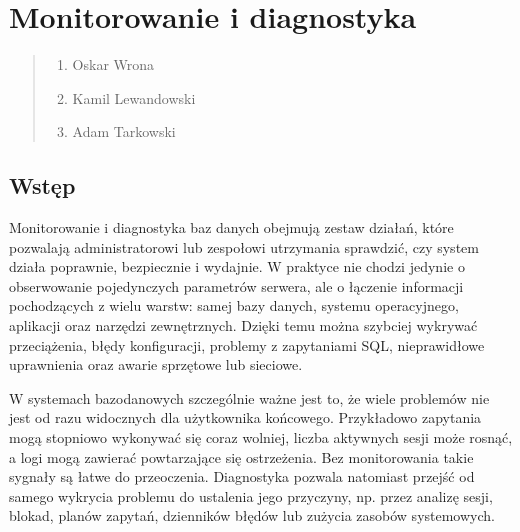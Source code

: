 \documentclass[letterpaper,10pt,polish]{sphinxmanual}
\begin{document}
\section{Monitorowanie i diagnostyka}
\label{\detokenize{rozdzia_u0142_2/rozdzia_u0142_24/index:monitorowanie-i-diagnostyka}}\label{\detokenize{rozdzia_u0142_2/rozdzia_u0142_24/index::doc}}\begin{quote}\begin{description}
\begin{enumerate}
%
\item {} 
\sphinxAtStartPar
Oskar Wrona

\item {} 
\sphinxAtStartPar
Kamil Lewandowski

\item {} 
\sphinxAtStartPar
Adam Tarkowski

\end{enumerate}

\end{description}\end{quote}


\subsection{Wstęp}
\label{\detokenize{rozdzia_u0142_2/rozdzia_u0142_24/index:wstep}}
\sphinxAtStartPar
Monitorowanie i diagnostyka baz danych obejmują zestaw działań, które pozwalają administratorowi lub zespołowi utrzymania sprawdzić, czy system działa poprawnie, bezpiecznie i wydajnie. W praktyce nie chodzi jedynie o obserwowanie pojedynczych parametrów serwera, ale o łączenie informacji pochodzących z wielu warstw: samej bazy danych, systemu operacyjnego, aplikacji oraz narzędzi zewnętrznych. Dzięki temu można szybciej wykrywać przeciążenia, błędy konfiguracji, problemy z zapytaniami SQL, nieprawidłowe uprawnienia oraz awarie sprzętowe lub sieciowe.

\sphinxAtStartPar
W systemach bazodanowych szczególnie ważne jest to, że wiele problemów nie jest od razu widocznych dla użytkownika końcowego. Przykładowo zapytania mogą stopniowo wykonywać się coraz wolniej, liczba aktywnych sesji może rosnąć, a logi mogą zawierać powtarzające się ostrzeżenia. Bez monitorowania takie sygnały są łatwe do przeoczenia. Diagnostyka pozwala natomiast przejść od samego wykrycia problemu do ustalenia jego przyczyny, np. przez analizę sesji, blokad, planów zapytań, dzienników błędów lub zużycia zasobów systemowych.
\end{document}
